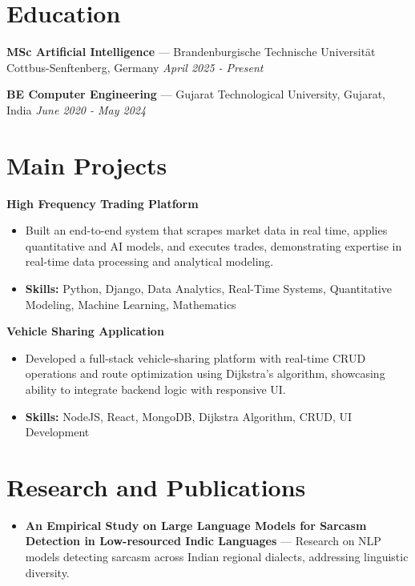 \documentclass[a4paper,10pt]{article}
\begin{document}
\section*{Education}
\textbf{MSc Artificial Intelligence} — Brandenburgische Technische Universität Cottbus-Senftenberg, Germany \hfill \textit{April 2025 - Present}\par
\vspace{1.5pt}
\textbf{BE Computer Engineering} — Gujarat Technological University, Gujarat, India \hfill \textit{June 2020 - May 2024}\par

\section*{Main Projects}
\textbf{High Frequency Trading Platform}\par
\vspace{1pt}
\begin{itemize}
  \item Built an end-to-end system that scrapes market data in real time, applies quantitative and AI models, and executes trades, demonstrating expertise in real-time data processing and analytical modeling.
  \item \textbf{Skills:} Python, Django, Data Analytics, Real-Time Systems, Quantitative Modeling, Machine Learning, Mathematics
\end{itemize}
\vspace{3pt}
\textbf{Vehicle Sharing Application}\par
\vspace{1pt}
\begin{itemize}
  \item Developed a full-stack vehicle-sharing platform with real-time CRUD operations and route optimization using Dijkstra's algorithm, showcasing ability to integrate backend logic with responsive UI.
  \item \textbf{Skills:} NodeJS, React, MongoDB, Dijkstra Algorithm, CRUD, UI Development
\end{itemize}

\section*{Research and Publications}
\begin{itemize}
\item \textbf{An Empirical Study on Large Language Models for Sarcasm Detection in Low-resourced Indic Languages} — Research on NLP models detecting sarcasm across Indian regional dialects, addressing linguistic diversity.
\end{itemize}
\end{document}
